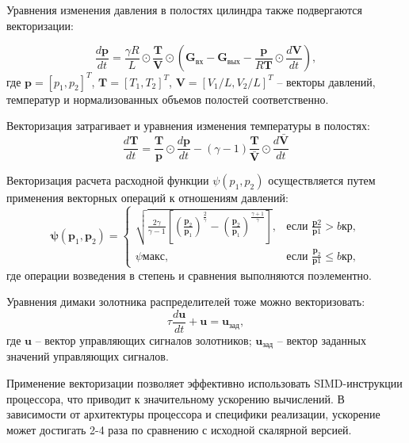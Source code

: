 Уравнения изменения давления в полостях цилиндра также подвергаются векторизации:

\begin{equation*}
    \frac{d\mathbf{p}}{dt} = \frac{\gamma R}{L} \odot \frac{\mathbf{T}}{\mathbf{V}} \odot
    \left(\mathbf{G}_{\text{вх}} - \mathbf{G}_{\text{вых}} - \frac{\mathbf{p}}{R\mathbf{T}} \odot \frac{d\mathbf{V}}{dt}\right),
\end{equation*}
где $\mathbf{p} = [p_1, p_2]^T$, $\mathbf{T} = [T_1, T_2]^T$, $\mathbf{V} = [V_1/L, V_2/L]^T$ --
векторы давлений, температур и нормализованных объемов полостей соответственно.

Векторизация затрагивает и уравнения изменения температуры в полостях:
\begin{equation*}
    \frac{d\mathbf{T}}{dt} = \frac{\mathbf{T}}{\mathbf{p}} \odot \frac{d\mathbf{p}}{dt} -
    (\gamma - 1) \frac{\mathbf{T}}{\bar{\mathbf{V}}} \odot \frac{d\bar{\mathbf{V}}}{dt}
\end{equation*}

Векторизация расчета расходной функции $\psi(p_1, p_2)$ осуществляется путем применения
векторных операций к отношениям давлений:
\begin{equation*}
    \boldsymbol{\psi}(\mathbf{p}_1, \mathbf{p}_2) = \begin{cases}
        \sqrt{\frac{2\gamma}{\gamma-1}\left[\left(\frac{\mathbf{p}_2}{\mathbf{p}_1}\right)^{\frac{2}{\gamma}} - \left(\frac{\mathbf{p}_2}{\mathbf{p}_1}\right)^{\frac{\gamma+1}{\gamma}}\right]}, & \text{если } \frac{\mathbf{p}2}{\mathbf{p}1} > b{кр},     \\
        \psi{макс},                                                                                                                                                                               & \text{если } \frac{\mathbf{p}_2}{\mathbf{p}1} \leq b{кр},
    \end{cases}
\end{equation*}
где операции возведения в степень и сравнения выполняются поэлементно.

Уравнения димаки золотника распределителей тоже можно векторизовать:
\begin{equation}
    \tau \frac{d\mathbf{u}}{dt} + \mathbf{u} = \mathbf{u}_\text{зад},
\end{equation}
где $\mathbf{u}$ -- вектор управляющих сигналов золотников;
$\mathbf{u}_\text{зад}$ -- вектор заданных значений управляющих сигналов.

Применение векторизации позволяет эффективно использовать SIMD-инструкции процессора,
что приводит к значительному ускорению вычислений. В зависимости от архитектуры процессора и
специфики реализации, ускорение может достигать 2-4 раза \cite*{tian2013simd} по сравнению с исходной скалярной версией.

